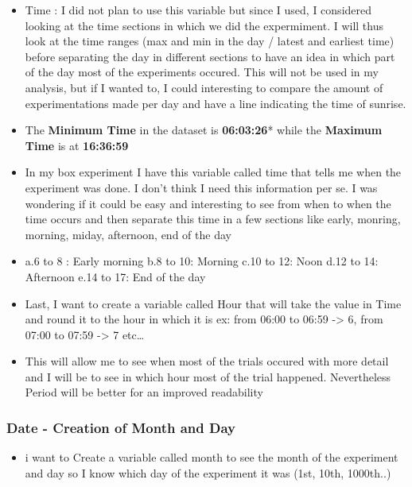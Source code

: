 \documentclass[
]{article}
\providecommand{\tightlist}{%
  \setlength{\itemsep}{0pt}\setlength{\parskip}{0pt}}
\begin{document}
\begin{itemize}
\item
  Time : I did not plan to use this variable but since I used, I
  considered looking at the time sections in which we did the
  expermiment. I will thus look at the time ranges (max and min in the
  day / latest and earliest time) before separating the day in different
  sections to have an idea in which part of the day most of the
  experiments occured. This will not be used in my analysis, but if I
  wanted to, I could interesting to compare the amount of
  experimentations made per day and have a line indicating the time of
  sunrise.
\item
  The \textbf{Minimum Time} in the dataset is \textbf{06:03:26}* while
  the \textbf{Maximum Time} is at \textbf{16:36:59}
\item
  In my box experiment I have this variable called time that tells me
  when the experiment was done. I don't think I need this information
  per se. I was wondering if it could be easy and interesting to see
  from when to when the time occurs and then separate this time in a few
  sections like early, monring, morning, miday, afternoon, end of the
  day
\item
  a.6 to 8 : Early morning b.8 to 10: Morning c.10 to 12: Noon d.12 to
  14: Afternoon e.14 to 17: End of the day
\item
  Last, I want to create a variable called Hour that will take the value
  in Time and round it to the hour in which it is ex: from 06:00 to
  06:59 -\textgreater{} 6, from 07:00 to 07:59 -\textgreater{} 7
  etc\ldots{}
\item
  This will allow me to see when most of the trials occured with more
  detail and I will be to see in which hour most of the trial happened.
  Nevertheless Period will be better for an improved readability
\end{itemize}

\hypertarget{date---creation-of-month-and-day}{%
\subsubsection{Date - Creation of Month and
Day}\label{date---creation-of-month-and-day}}

\begin{itemize}
\tightlist
\item
  i want to Create a variable called month to see the month of the
  experiment and day so I know which day of the experiment it was (1st,
  10th, 1000th..)
\end{itemize}
\end{document}
